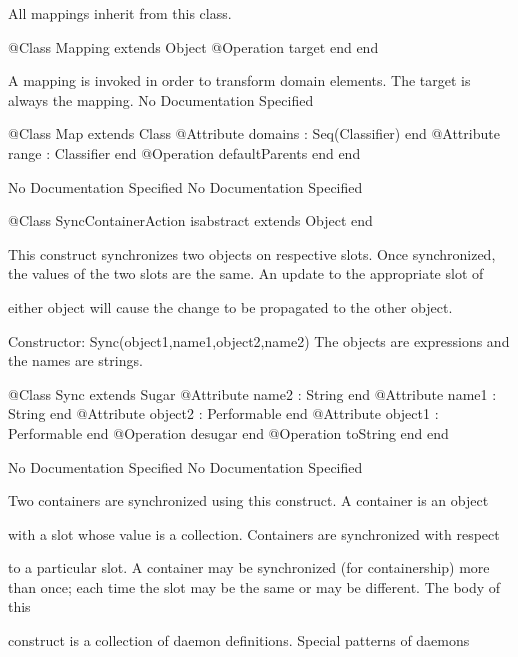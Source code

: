       All mappings inherit from this class.
\begin{Interface}
@Class Mapping extends Object
  @Operation target end
end
\end{Interface}

        A mapping is invoked in order to transform domain elements.
        The target is always the mapping.
No Documentation Specified
\begin{Interface}
@Class Map extends Class
  @Attribute domains : Seq(Classifier) end
  @Attribute range : Classifier end
  @Operation defaultParents end
end
\end{Interface}
No Documentation Specified
No Documentation Specified
\begin{Interface}
@Class SyncContainerAction isabstract extends Object
end
\end{Interface}

      This construct synchronizes two objects on respective slots. Once synchronized,
      the values of the two slots are the same. An update to the appropriate slot of

      either object will cause the change to be propagated to the other object.
      
      Constructor: Sync(object1,name1,object2,name2)
       The objects are expressions and the names are strings.
\begin{Interface}
@Class Sync extends Sugar
  @Attribute name2 : String end
  @Attribute name1 : String end
  @Attribute object2 : Performable end
  @Attribute object1 : Performable end
  @Operation desugar end
  @Operation toString end
end
\end{Interface}
No Documentation Specified
No Documentation Specified

       Two containers are synchronized using this construct. A container is an object

       with a slot whose value is a collection. Containers are synchronized with respect

       to a particular slot. A container may be synchronized (for containership) more than 
       once; each time the slot may be the same or may be different. The body of this

       construct is a collection of daemon definitions. Special patterns of daemons

